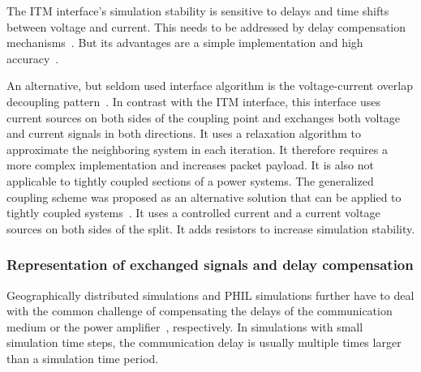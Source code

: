 \documentclass[a4paper]{atseminar}
\begin{document}
The ITM interface's simulation stability is sensitive to delays and time shifts between voltage and current. This needs to be addressed by delay compensation mechanisms~\cite{stevic2015sim}. But its advantages are a simple implementation and high accuracy~\cite{brandl2017}.

An alternative, but seldom used interface algorithm is the voltage-current overlap decoupling pattern~\cite{wu2006}. In contrast with the ITM interface, this interface uses current sources on both sides of the coupling point and exchanges both voltage and current signals in both directions. It uses a relaxation algorithm to approximate the neighboring system in each iteration. It therefore requires a more complex implementation and increases packet payload. It is also not applicable to tightly coupled sections of a power systems. 
The generalized coupling scheme was proposed as an alternative solution that can be applied to tightly coupled systems~\cite{bastos2007}. It uses a controlled current and a current voltage sources on both sides of the split. It adds resistors to increase simulation stability.


\subsubsection{Representation of exchanged signals and delay compensation}
\label{MH:sec:signal-repr}
\label{MH:sec:delay}


Geographically distributed simulations and PHIL simulations further have to deal with the common challenge of compensating the delays of the communication medium or the power amplifier~\cite{sansano2015harmonic}, respectively.
In simulations with small simulation time steps, the communication delay is usually multiple times larger than a simulation time period.

\end{document}
